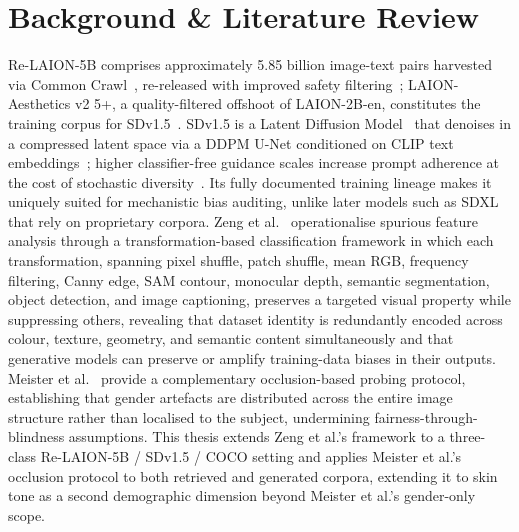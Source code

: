

\chapter{Background \& Literature Review}

Re-LAION-5B comprises approximately 5.85 billion image-text pairs harvested via Common
Crawl~\cite{Schuhmann_2022_Laion5b}, re-released with improved safety
filtering~\cite{Laion_2024_Relaion5B}; LAION-Aesthetics v2 5+, a quality-filtered
offshoot of LAION-2B-en, constitutes the training corpus for
SDv1.5~\cite{Schuhmann_2022_LaionAesthetics}. SDv1.5 is a
Latent Diffusion Model~\cite{Rombach_2022_CVPR} that denoises in a compressed latent
space via a DDPM U-Net conditioned on CLIP text
embeddings~\cite{Ho_2020_DDPM,Radford_2021_CLIP}; higher classifier-free guidance scales
increase prompt adherence at the cost of stochastic diversity~\cite{Ho_2022_CFG}. Its
fully documented training lineage makes it uniquely suited for mechanistic bias auditing,
unlike later models such as SDXL~\cite{Podell_2023_SDXL} that rely on proprietary
corpora. Zeng et al.~\cite{Zeng_2024_UnderstandingBiasinLargeScaleVisualDatasets} operationalise spurious
feature analysis through a transformation-based classification framework in which each
transformation, spanning pixel shuffle, patch shuffle, mean RGB, frequency filtering,
Canny edge, SAM contour, monocular depth, semantic segmentation, object detection, and
image captioning, preserves a targeted visual property while suppressing others,
revealing that dataset identity is redundantly encoded across colour, texture, geometry,
and semantic content simultaneously and that generative models can preserve or amplify training-data biases in their outputs.
Meister et al.~\cite{Meister_2023_GenderArtifactsinVisualDatasets} provide a complementary
occlusion-based probing protocol, establishing that gender
artefacts are distributed across the entire image structure rather than localised to the
subject, undermining fairness-through-blindness assumptions. This thesis extends Zeng et
al.'s framework to a three-class Re-LAION-5B / SDv1.5 / COCO setting and applies
Meister et al.'s occlusion protocol to both retrieved and generated corpora, extending
it to skin tone as a second demographic dimension beyond Meister et al.'s gender-only
scope.

